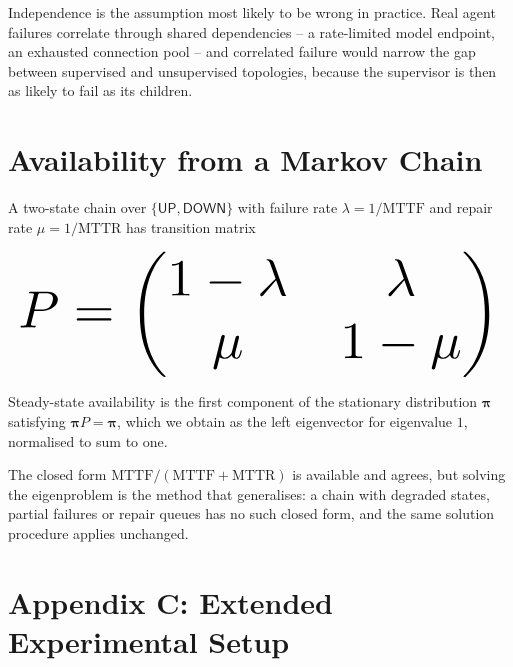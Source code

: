 \documentclass{article}
\begin{document}
Independence is the assumption most likely to be wrong in practice. Real agent failures correlate through shared dependencies -- a rate-limited model endpoint, an exhausted connection pool -- and correlated failure would narrow the gap between supervised and unsupervised topologies, because the supervisor is then as likely to fail as its children.


\section{Availability from a Markov Chain}


A two-state chain over $\{\textsf{UP}, \textsf{DOWN}\}$ with failure rate $\lambda = 1/\mathrm{MTTF}$ and repair rate $\mu = 1/\mathrm{MTTR}$ has transition matrix











\begin{equation}
\resizebox{\columnwidth}{!}{$\displaystyle
\begin{aligned}
P = \begin{pmatrix} 1 - \lambda & \lambda \\ \mu & 1 - \mu \end{pmatrix}
\end{aligned}
$}
\end{equation}











Steady-state availability is the first component of the stationary distribution $\boldsymbol{\pi}$ satisfying $\boldsymbol{\pi} P = \boldsymbol{\pi}$, which we obtain as the left eigenvector for eigenvalue $1$, normalised to sum to one.

The closed form $\mathrm{MTTF}/(\mathrm{MTTF} + \mathrm{MTTR})$ is available and agrees, but solving the eigenproblem is the method that generalises: a chain with degraded states, partial failures or repair queues has no such closed form, and the same solution procedure applies unchanged.




\section{Appendix C: Extended Experimental Setup}
\end{document}
